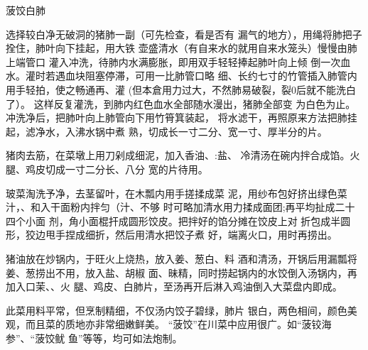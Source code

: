 \begin{recipe}[菠饺银肺]{菠饺白肺}

\ingredients


\cooking

\step 选择较白净无破洞的猪肺一副（可先检查，看是否有 漏气的地方），用绳将肺把子拴住，肺叶向下挂起，用大铁 壶盛清水（有自来水的就用自来水笼头）慢慢由肺上端管口 灌入冲洗，待肺内水满膨胀，即用双手轻轻捧起肺叶向上倾 倒一次血水。灌时若遇血块阻塞停滞，可用一比肺管口略 细、长约七寸的竹管插入肺管内用手轻拍，使之畅通再、灌 (但本倉用力过大，不然肺易破裂，裂0后就不能洗白了）。 这样反复灌洗，到肺内红色血水全部随水漫出，猪肺全部变 为白色为止。冲洗净后，把肺叶向上肺管向下用竹筲箕装起， 将水滤干，再照原来方法把肺挂起，滤净水，入沸水锅中煮 熟，切成长一寸二分、宽一寸、厚半分的片。

\step 猪肉去筋，在菜墩上用刀剁成细泥，加入香油、:盐、 冷清汤在碗内拌合成馅。火腿、鸡皮切成一寸二分长、八分 宽的片待用。

\step 玻菜淘洗予净，去茎留叶，在木瓢内用手搓揉成菜 泥，用纱布包好挤出绿色菜汁，、和入干面粉内拌匀（汁、不够 时可略加清水用力揉成面团;再平均扯成二十四个小面 剂，角小面棍扞成圆形饺皮。把拌好的馅分摊在饺皮上对 折包成半圆形，狡边甩手捏成细折，然后用清水把饺子煮 好，端离火口，用时再捞出。

\step 猪油放在炒锅内，于旺火上烧热，放入姜、葱白、料 酒和清汤，开锅后用漏瓢将姜、葱捞出不用，放入盐、胡椒 面、昧精，同时捞起锅内的水饺倒入汤锅内，再加入口茉、、火 腿、鸡皮、白肺片，至汤再开后淋入鸡油倒入大菜盘内即成。

\notes

此菜用料平常，但烹制精细，不仅汤内饺子碧绿，肺片
银白，两色相间，颜色美观，而且菜的质地亦非常细嫩鲜美。 “菠饺”在川菜中应用很广。如“菠铰海参”、“菠饺鱿 鱼”等等，均可如法炮制。

\end{recipe}

